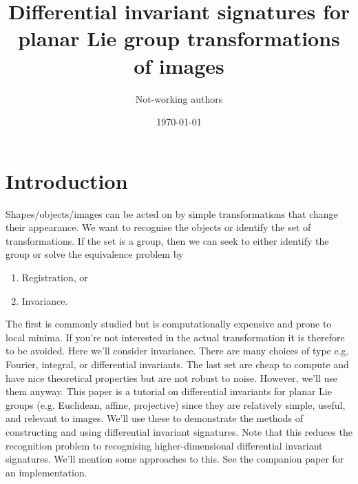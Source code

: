 \documentclass[review,onefignum,onetabnum]{siamonline190516}
\date{\today}
\title{Differential invariant signatures for planar Lie group transformations of images}
\author{Not-working authors }
\begin{document}
\maketitle
\begin{abstract}
\end{abstract}


\begin{keywords}

\end{keywords}

\begin{AMS}

\end{AMS}

\section{Introduction}


Shapes/objects/images can be acted on by simple transformations that change
their appearance. We want to recognise the objects or identify the set of
transformations. If the set is a group, then we can seek to either identify
the group or solve the equivalence problem by
\begin{enumerate}
    \item Registration, or
    \item Invariance.
\end{enumerate}
The first is commonly studied but is computationally expensive and prone to
local minima. If you're not interested in the actual transformation it is
therefore to be avoided. Here we'll consider invariance. There are many
choices of type e.g. Fourier, integral, or differential invariants. The
last set are cheap to compute and have nice theoretical properties but are
not robust to noise. However, we'll use them anyway. This paper is a
tutorial on differential invariants for planar Lie groups (e.g.
Euclidean, affine, projective) since they are relatively simple, useful,
and relevant to images. We'll use these to demonstrate the methods of
constructing and using differential invariant signatures. Note that this
reduces the recognition problem to recognising higher-dimensional
differential invariant signatures. We'll mention some approaches to this.
See the companion paper for an implementation.
\end{document}
